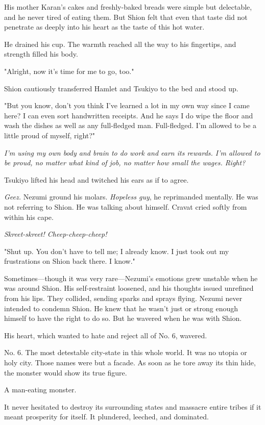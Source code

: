 His mother Karan's cakes and freshly-baked breads were simple but
delectable, and he never tired of eating them. But Shion felt that even
that taste did not penetrate as deeply into his heart as the taste of
this hot water.

He drained his cup. The warmth reached all the way to his
fingertips, and strength filled his body.

"Alright, now it's time for me to go, too."

Shion cautiously transferred Hamlet and Tsukiyo to the bed and stood up.

"But you know, don't you think I've learned a lot in my own way since I
came here? I can even sort handwritten receipts. And he says I do wipe
the floor and wash the dishes as well as any full-fledged man.
Full-fledged. I'm allowed to be a little proud of myself, right?"

\emph{I'm using my own body and brain to do work and earn its rewards. I'm
allowed to be proud, no matter what kind of job, no matter how small the
wages. Right?}

Tsukiyo lifted his head and twitched his ears as if to agree.

\emph{Geez.} Nezumi ground his molars. \emph{Hopeless guy}, he reprimanded mentally.
He was not referring to Shion. He was talking about himself. Cravat
cried softly from within his cape.

\emph{Skreet-skreet! Cheep-cheep-cheep!}

"Shut up. You don't have to tell me; I already know. I just took out my
frustrations on Shion back there. I know."

Sometimes---though it was very rare---Nezumi's emotions grew unstable when
he was around Shion. His self-restraint loosened, and his thoughts
issued unrefined from his lips. They collided, sending sparks and sprays
flying. Nezumi never intended to condemn Shion. He knew that he wasn't
just or strong enough himself to have the right to do so. But he wavered
when he was with Shion.

His heart, which wanted to hate and reject all of No. 6, wavered.

No. 6. The most detestable city-state in this whole world. It was no
utopia or holy city. Those names were but a facade. As soon as he tore
away its thin hide, the monster would show its true figure.

A man-eating monster.

It never hesitated to destroy its surrounding states and massacre entire
tribes if it meant prosperity for itself. It plundered, leeched, and
dominated.

